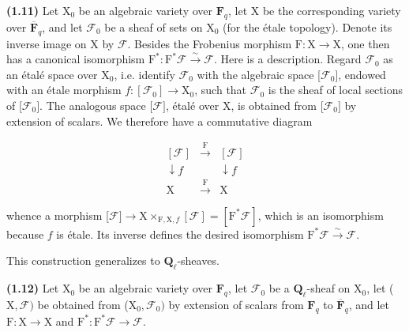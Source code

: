 \documentclass[10pt,leqno]{article}
\begin{document}
\noindent \textbf{(1.11)} Let \(\mathrm{X}_{0}\) be an algebraic variety over \(\mathbf{F}_{q}\), let \(\mathrm{X}\) be the corresponding variety over \(\overline{\mathbf{F}}_{q}\), and let \(\mathcal{F} _{0}\) be a sheaf of sets on \(\mathrm{X}_{0}\) (for the étale topology). Denote its inverse image on \(\mathrm{X}\) by \(\mathcal{F} \). Besides the Frobenius morphism \(\mathrm{F}:\mathrm{X}\longrightarrow \mathrm{X}\), one then has a canonical isomorphism \(\mathrm{F}^{*}:\mathrm{F}^{*}\mathcal{F} \xrightarrow{\sim }\mathcal{F} \). Here is a description. Regard \(\mathcal{F} _{0}\) as an étalé space over \(\mathrm{X}_{0}\), i.e. identify \(\mathcal{F} _{0}\) with the algebraic space [\(\mathcal{F} _{0}]\), endowed with an étale morphism \(f:[\mathcal{F} _{0}]\longrightarrow \mathrm{X}_{0}\), such that \(\mathcal{F} _{0}\) is the sheaf of local sections of [\(\mathcal{F} _{0}]\). The analogous space [\(\mathcal{F} ]\), étalé over \(\mathrm{X}\), is obtained from [\(\mathcal{F} _{0}]\) by extension of scalars. We therefore have a commutative diagram\par

\[\begin{array}{ccc}[\mathcal F]&\xrightarrow{\mathrm F}&[\mathcal F]\\ \downarrow\!f&&\downarrow\!f\\ \mathrm X&\xrightarrow{\mathrm F}&\mathrm X\end{array}\]

\noindent whence a morphism [\(\mathcal{F} ]\longrightarrow \mathrm{X}\times _{\mathrm{F},\mathrm{X},f}[\mathcal{F} ]=[\mathrm{F}^{*}\mathcal{F} ]\), which is an isomorphism because \(f\) is étale. Its inverse defines the desired isomorphism \(\mathrm{F}^{*}\mathcal{F} \xrightarrow{\sim }\mathcal{F} \).\par

\noindent This construction generalizes to \(\mathbf{Q}_{\ell }\)-sheaves.\par

\noindent \textbf{(1.12)} Let \(\mathrm{X}_{0}\) be an algebraic variety over \(\mathbf{F}_{q}\), let \(\mathcal{F} _{0}\) be a \(\mathbf{Q}_{\ell }\)-sheaf on \(\mathrm{X}_{0}\), let (\(\mathrm{X},\mathcal{F} )\) be obtained from (\(\mathrm{X}_{0},\mathcal{F} _{0})\) by extension of scalars from \(\mathbf{F}_{q}\) to \(\overline{\mathbf{F}}_{q}\), and let \(\mathrm{F}:\mathrm{X}\longrightarrow \mathrm{X}\) and \(\mathrm{F}^{*}:\mathrm{F}^{*}\mathcal{F} \longrightarrow \mathcal{F} \).\par
\end{document}
